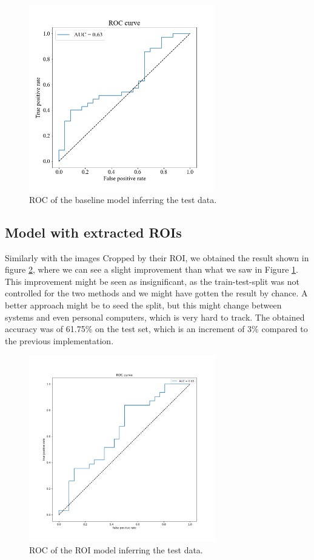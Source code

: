 \documentclass[conference]{IEEEtran}
\begin{document}
\begin{figure}
\centering
\includegraphics[width=3.2in]{roc_baseline}
\caption{ROC of the baseline model inferring the test data.}
\label{fig:roc_baseline}
\end{figure}
\subsection{Model with extracted ROIs}

Similarly with the images Cropped by their ROI, we obtained the result shown in figure \ref{fig:roc_ROI}, where we can see a slight improvement than what we saw in Figure \ref{fig:roc_baseline}. This improvement might be seen as insignificant, as the train-test-split was not controlled for the two methods and we might have gotten the result by chance. A better approach might be to seed the split, but this might change between systems and even personal computers, which is very hard to track. The obtained accuracy was of 61.75\% on the test set, which is an increment of 3\% compared to the previous implementation. 

\begin{figure}
\centering
\includegraphics[width=3.2in]{roc_ROI}
\caption{ROC of the ROI model inferring the test data.}
\label{fig:roc_ROI}
\end{figure}
\end{document}
